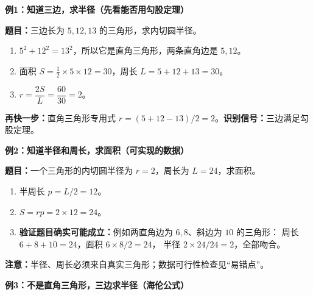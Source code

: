 \begin{examplebox}
\par\noindent\begin{minipage}{\linewidth}
\textbf{\textcolor{CExample}{例1：知道三边，求半径（先看能否用勾股定理）}}

\textbf{题目：}三边长为 $5,12,13$ 的三角形，求内切圆半径。
\end{minipage}\par
\begin{enumerate}[leftmargin=*,itemsep=0.45em]
 \item $5^2+12^2=13^2$，所以它是直角三角形，两条直角边是 $5,12$。
 \item 面积 $S=\frac12\times5\times12=30$，周长 $L=5+12+13=30$。
 \item $r=\dfrac{2S}{L}=\dfrac{60}{30}=\boxed{2}$。
\end{enumerate}
\textbf{再快一步：}直角三角形专用式
$r=(5+12-13)/2=2$。\textbf{识别信号：}三边满足勾股定理。

\medskip
\par\noindent\begin{minipage}{\linewidth}
\textbf{\textcolor{CExample}{例2：知道半径和周长，求面积（可实现的数据）}}

\textbf{题目：}一个三角形的内切圆半径为 $r=2$，周长为 $L=24$，求面积。
\end{minipage}\par
\begin{enumerate}[leftmargin=*,itemsep=0.4em]
 \item 半周长 $p=L/2=12$。
 \item $S=rp=2\times12=\boxed{24}$。
 \item \textbf{验证题目确实可能成立：}例如两直角边为 $6,8$、斜边为 $10$ 的三角形：
 周长 $6+8+10=24$，面积 $6\times8/2=24$，
 半径 $2\times24/24=2$，全部吻合。
\end{enumerate}
\textbf{注意：}半径、周长必须来自真实三角形；数据可行性检查见“易错点”。

\medskip
\par\noindent\begin{minipage}{\linewidth}
\textbf{\textcolor{CExample}{例3：不是直角三角形，三边求半径（海伦公式）}}


\end{minipage}
\end{examplebox}
